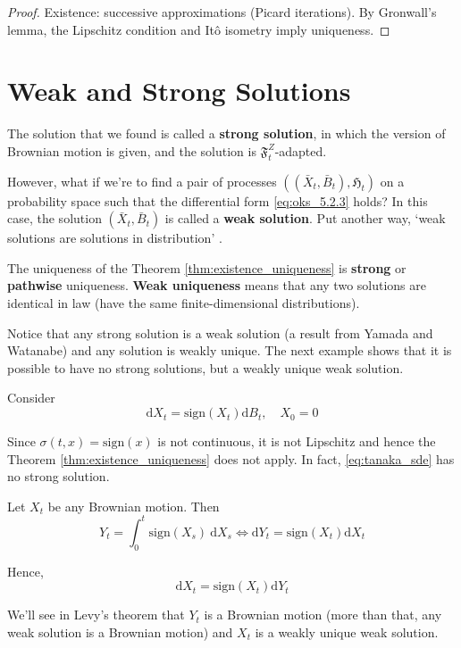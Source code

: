 \begin{proof}
    Existence: successive approximations (Picard iterations). By Gronwall's lemma, the Lipschitz condition and Itô isometry imply uniqueness.
\end{proof}

\section{Weak and Strong Solutions}

The solution that we found is called a \textbf{strong solution}, in which the version of Brownian motion is given, and the solution is $\mathfrak{F}_t^Z$-adapted. 

However, what if we're to find a pair of processes $((\bar{X}_t, \bar{B}_t), \mathfrak{H}_t)$ on a probability space such that the differential form \eqref{eq:oks_5.2.3} holds? In this case, the solution $(\bar{X}_t, \bar{B}_t)$ is called a \textbf{weak solution}. Put another way, `weak solutions are solutions in distribution' \cite[137]{klebaner2012introduction}.

The uniqueness of the Theorem \ref{thm:existence_uniqueness} is \textbf{strong} or \textbf{pathwise} uniqueness. \textbf{Weak uniqueness} means that any two solutions are identical in law (have the same finite-dimensional distributions). 

Notice that any strong solution is a weak solution (a result from Yamada and Watanabe) and any solution is weakly unique. The next example shows that it is possible to have no strong solutions, but a weakly unique weak solution.

\begin{example}
  Consider 
  \begin{equation}
    \mathrm{d}X_t = \text{sign}(X_t) \mathrm{d}B_t, \quad X_0 = 0
    \label{eq:tanaka_sde}
  \end{equation}
  
  Since $\sigma(t,x) = \text{sign}(x)$ is not continuous, it is not Lipschitz and hence the Theorem \ref{thm:existence_uniqueness} does not apply. In fact, \eqref{eq:tanaka_sde} has no strong solution. 

  Let $X_t$ be any Brownian motion. Then 
  \[
    Y_t = \int_0^t \text{sign}(X_s)~\mathrm{d}X_s \iff \mathrm{d}Y_t = \text{sign}(X_t) \mathrm{d}X_t
  \]

  Hence,
  \[
    \mathrm{d}X_t = \text{sign}(X_t) \mathrm{d}Y_t
  \]

  We'll see in Levy's theorem that $Y_t$ is a Brownian motion (more than that, any weak solution is a Brownian motion) and $X_t$ is a weakly unique weak solution.    
\end{example}
